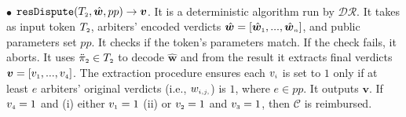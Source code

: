 \begin{definition}
\

\item  [$\bullet$] $\mathtt{resDispute}(T_{\scriptscriptstyle2}, \hat {\bm w}, pp)\rightarrow {\bm v}$. It is a deterministic algorithm run by $\mathcal {DR}$. It takes as input token $T_{\scriptscriptstyle 2}$,   arbiters' encoded verdicts  $\hat{ \bm{w}}=[\hat{\bm{w}}_{\scriptscriptstyle 1},..., \hat{\bm{w}}_{\scriptscriptstyle n}]$, and  public parameters set $pp$. It checks if the token's parameters match. If the check fails, it aborts. It uses $\ddot \pi_{\scriptscriptstyle 2}\in T_{\scriptscriptstyle 2}$  to decode $\hat {\bm w}$ and from the result it extracts final verdicts $\bm v= [v_{\scriptscriptstyle 1},...,v_{\scriptscriptstyle 4}]$.  The extraction procedure ensures each $v_{\scriptscriptstyle i}$ is set to $1$ only if at least  $e$ arbiters' original verdicts (i.e., $w_{\scriptscriptstyle i,j,}$) is $1$, where $e\in pp$.  It outputs $\bm v$. If $v_{\scriptscriptstyle 4}=1$ and (i) either $v_{\scriptscriptstyle 1}=1$ (ii) or $v_{\scriptscriptstyle 2}=1$ and $v_{\scriptscriptstyle 3}=1$, then  $\mathcal C$  is reimbursed.
\end{definition}



%





